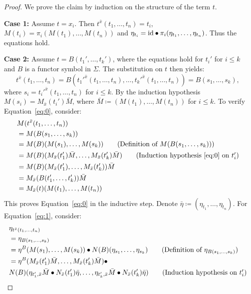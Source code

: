 \begin{proof}
We prove the claim by induction on the structure of the term $t$.

\noindent\textbf{Case 1:} Assume $t = x_i$. Then $t^{\bar{x}}(t_1,\ldots, t_n) = t_i$, $M(t_i) = \pi_i(M(t_1),\ldots, M(t_n))$ and $\eta_{t_i} = \mathrm{id}\bullet \pi_i(\eta_{t_1},\ldots, \eta_{t_n})$. Thus the equations hold.

\noindent\textbf{Case 2:} Assume $t = B(t_1',\ldots, t_k')$, where the equations hold for $t_i'$ for $i\leq k$ and $B$ is a functor symbol in $\Sigma$.
The substitution on $t$ then yields:
\[
t^{\bar{x}}(t_1, \dots, t_n) = B(t_1'^{\bar{x}}(t_1,\ldots, t_n),\ldots, t_k'^{\bar{x}}(t_1,\ldots, t_n))= B(s_1, \dots, s_k),
\]
where $s_i = t_i'^{\bar{x}}(t_1,\ldots, t_n)$ for $i\leq k$. By the induction hypothesis $M(s_i) = M_{\bar{x}}(t_i')\bar{M}$, where $\bar{M}\coloneqq (M(t_1),\ldots, M(t_n))$ for $i\leq k$.
To verify Equation~\eqref{eq:0}, consider:
\begin{align*}
   &M(t^{\bar{x}}(t_1, \dots, t_n)) \\
   &= M(B(s_1, \dots, s_k)) \\
   &= M(B)(M(s_1), \dots, M(s_k)) \tag{Definition of $M(B(s_1,\dots, s_k))$} \\
   &= M(B) (M_{\bar{x}}(t'_1)\bar{M}, \dots, M_{\bar{x}}(t'_k)\bar{M}) \tag{Induction hypothesis \eqref{eq:0} on $t'_i$} \\
   &= M(B) (M_{\bar{x}}(t'_1), \dots, M_{\bar{x}}(t'_k)) \bar{M} \\
   &= M_{\bar{x}}(B(t'_1, \dots, t'_k))\bar{M} \\
   &= M_{\bar{x}}(t)(M(t_1), \dots, M(t_n))
\end{align*}
This proves Equation~\eqref{eq:0} in the inductive step. Denote $\bar{\eta}\coloneqq (\eta_{t_1},\ldots, \eta_{t_n})$. For Equation~\eqref{eq:1}, consider:
{
\begin{align*}
   &\eta_{t^{\bar{x}}(t_1,\ldots, t_n)}\\
   &= \eta_{B(s_1,\ldots, s_k)}\\
   &= \eta^B (M(s_1),\ldots, M(s_k)) \bullet N(B)(\eta_{s_1},\ldots, \eta_{s_k}) \tag{Definition of $\eta_{B(s_1,\ldots, s_k)}$}\\
   &= \eta^B(M_{\bar{x}}(t_1')\bar{M},\ldots, M_{\bar{x}}(t_k')\bar{M})\bullet\\
   & N(B)(\eta_{t_1',\bar{x}}\bar{M} \bullet N_{\bar{x}}(t_1')\bar{\eta},\ldots, \eta_{t_k',\bar{x}}\bar{M}\bullet N_{\bar{x}}(t_k')\bar{\eta}) \tag{Induction hypothesis on $t_i'$}\\

\end{align*}}
\end{proof}
